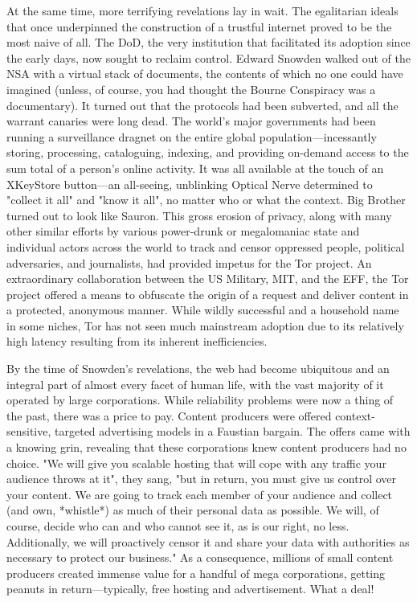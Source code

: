 At the same time, more terrifying revelations lay in wait. The egalitarian ideals that once underpinned the construction of a trustful internet proved to be the most naive of all. The DoD, the very institution that facilitated its adoption since the early days, now sought to reclaim control. Edward Snowden walked out of the NSA with a virtual stack of documents, the contents of which no one could have imagined (unless, of course, you had thought the Bourne Conspiracy was a documentary). It turned out that the protocols had been subverted, and all the warrant canaries were long dead. The world's major governments had been running a surveillance dragnet on the entire global population—incessantly storing, processing, cataloguing, indexing, and providing on-demand access to the sum total of a person's online activity. It was all available at the touch of an XKeyStore button—an all-seeing, unblinking Optical Nerve determined to "collect it all" and "know it all", no matter who or what the context. Big Brother turned out to look like Sauron.
This gross erosion of privacy, along with many other similar efforts by various power-drunk or megalomaniac state and individual actors across the world to track and censor oppressed people, political adversaries, and journalists, had provided impetus for the Tor project. An extraordinary collaboration between the US Military, MIT, and the EFF, the Tor project offered a means to obfuscate the origin of a request and deliver content in a protected, anonymous manner. While wildly successful and a household name in some niches, Tor has not seen much mainstream adoption due to its relatively high latency resulting from its inherent inefficiencies.

By the time of Snowden's revelations, the web had become ubiquitous and an integral part of almost every facet of human life, with the vast majority of it operated by large corporations. While reliability problems were now a thing of the past, there was a price to pay. Content producers were offered context-sensitive, targeted advertising models in a Faustian bargain. The offers came with a knowing grin, revealing that these corporations knew content producers had no choice. "We will give you scalable hosting that will cope with any traffic your audience throws at it", they sang, "but in return, you must give us control over your content. We are going to track each member of your audience and collect (and own, *whistle*) as much of their personal data as possible. We will, of course, decide who can and who cannot see it, as is our right, no less. Additionally, we will proactively censor it and share your data with authorities as necessary to protect our business." As a consequence, millions of small content producers created immense value for a handful of mega corporations, getting peanuts in return---typically, free hosting and advertisement. What a deal!

